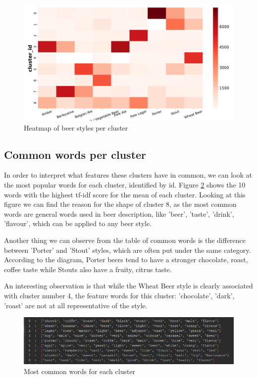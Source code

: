 \documentclass[12pt]{article}
\begin{document}
	\begin{figure}
		\includegraphics[width=\linewidth]{resources/9500rheatmap.png}
		\caption{Heatmap of beer styles per cluster}
		\label{fig:heatmap}
	\end{figure}
	
	\subsection{Common words per cluster}
	In order to interpret what features these clusters have in common, we can look at the most popular words for each cluster, identified by id. Figure \ref{fig:words} shows the 10 words with the highest tf-idf score for the mean of each cluster. Looking at this figure we can find the reason for the shape of cluster 8, as the most common words are general words used in beer description, like 'beer', 'taste', 'drink', 'flavour', which can be applied to any beer style. 
	
	Another thing we can observe from the table of common words is the difference between 'Porter' and 'Stout' styles, which are often put under the same category. According to the diagram, Porter beers tend to have a stronger chocolate, roast, coffee taste while Stouts also have a fruity, citrus taste.
	
	An interesting observation is that while the Wheat Beer style is clearly associated with cluster number 4, the feature words for this cluster: 'chocolate', 'dark', 'roast' are not at all representative of the style.
	
	\begin{figure}
		\includegraphics[width=\linewidth]{resources/words.png}
		\caption{Most common words for each cluster}
		\label{fig:words}
	\end{figure}
	
	
	\newpage
	
	
\end{document}
